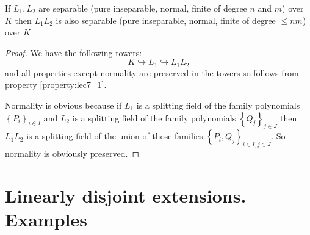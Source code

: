 \begin{property}
  If $L_1, L_2$ are separable (pure inseparable, normal, finite of
  degree $n$ and $m$) over $K$ then $L_1 L_2$ is also separable (pure
  inseparable, normal, finite of degree $ \le n m $) over $K$
  \begin{proof}
    We have the following towers:
    \[
    K \hookrightarrow L_1 \hookrightarrow L_1 L_2
    \]
    and all properties except normality are preserved in the towers so
    follows from property \ref{property:lec7_1}.

    Normality is obvious because if $L_1$ is a splitting field of the
    family polynomials $\left\{P_i\right\}_{i \in I}$
    and $L_2$ is a splitting field of the
    family polynomials $\left\{Q_j\right\}_{j \in J}$ then
    $L_1 L_2$ is a splitting field of the union of those families
    $\left\{P_i, Q_j\right\}_{i \in I, j \in J}$. So normality is
    obviously preserved.  
  \end{proof}
  \label{property:lec7_2}
\end{property}


\section{Linearly disjoint extensions. Examples}

